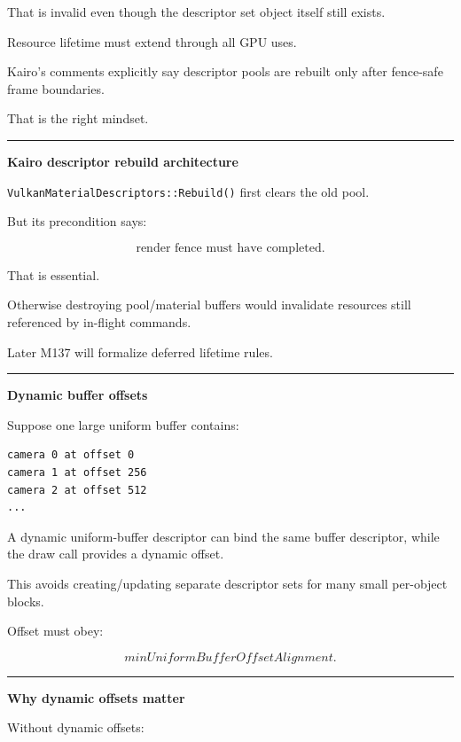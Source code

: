 That is invalid even though the descriptor set object itself still exists.

Resource lifetime must extend through all GPU uses.

Kairo's comments explicitly say descriptor pools are rebuilt only after fence-safe frame boundaries.

That is the right mindset.

\begin{center}\rule{0.5\linewidth}{0.5pt}\end{center}

\textbf{Kairo descriptor rebuild architecture}

\texttt{VulkanMaterialDescriptors::Rebuild()} first clears the old pool.

But its precondition says:

\[
\boxed{
\text{render fence must have completed}.
}
\]

That is essential.

Otherwise destroying pool/material buffers would invalidate resources still referenced by in-flight commands.

Later M137 will formalize deferred lifetime rules.

\begin{center}\rule{0.5\linewidth}{0.5pt}\end{center}

\textbf{Dynamic buffer offsets}

Suppose one large uniform buffer contains:

\protect{}\label{p11-dyn-ubo}%
\begin{verbatim}
camera 0 at offset 0
camera 1 at offset 256
camera 2 at offset 512
...
\end{verbatim}

A dynamic uniform-buffer descriptor can bind the same buffer descriptor, while the draw call provides a dynamic offset.

This avoids creating/updating separate descriptor sets for many small per-object blocks.

Offset must obey:

\[
minUniformBufferOffsetAlignment.
\]

\begin{center}\rule{0.5\linewidth}{0.5pt}\end{center}

\textbf{Why dynamic offsets matter}

Without dynamic offsets:

